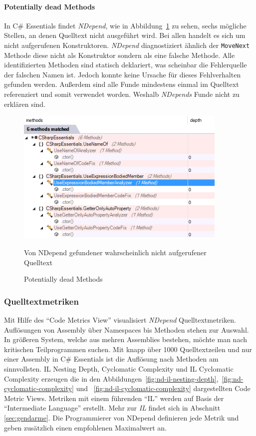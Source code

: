 \paragraph{Potentially dead Methods} In C\# Essentials findet \emph{NDepend}, wie in Abbildung~\ref{fig:dead-methods} zu sehen, sechs mögliche Stellen, an denen Quelltext nicht ausgeführt wird. Bei allen handelt es sich um nicht aufgerufenen Konstruktoren. \emph{NDepend} diagnostiziert ähnlich der \texttt{MoveNext} Methode diese nicht als Konstruktor sondern als eine falsche Methode. Alle identifizierten Methoden sind statisch deklariert, was scheinbar die Fehlerquelle der falschen Namen ist. Jedoch konnte keine Ursache für dieses Fehlverhalten gefunden werden. Außerdem sind alle Funde mindestens einmal im Quelltext referenziert und somit verwendet worden. Weshalb \emph{NDepends} Funde nicht zu erklären sind.

\begin{figure}[!ht]
\centering
\includegraphics[width=0.9\textwidth]{images/dead-methods.png}
\caption{Potentially dead Methods}
\vspace{0.1cm}
Von NDepend gefundener wahrscheinlich nicht aufgerufener Quelltext
\label{fig:dead-methods}
\end{figure}

\subsubsection{Quelltextmetriken}
\label{sec:nd-code-metrics}
Mit Hilfe des \enquote{Code Metrics View} visualisiert \emph{NDepend} Quelltextmetriken. Auflösungen von Assembly über Namespaces bis Methoden stehen zur Auswahl. In größeren System, welche aus mehren Assemblies bestehen, möchte man nach kritischen Teilprogrammen suchen. Mit knapp über 1000 Quelltextzeilen und nur einer Assembly in C\# Essentials ist die Auflösung nach Methoden am sinnvollsten. IL Nesting Depth, Cyclomatic Complexity und IL Cyclomatic Complexity erzeugen die in den Abbildungen~\ref{fig:nd-il-nesting-depth},~\ref{fig:nd-cyclomatic-complexity} und ~\ref{fig:nd-il-cyclomatic-complexity} dargestellten Code Metric Views. Metriken mit einem führenden \enquote{IL} werden auf Basis der \enquote{Intermediate Language} erstellt. Mehr zur \emph{IL} findet sich in Abschnitt \ref{sec:gendarme}. Die Programmierer von NDepend definieren jede Metrik und geben zusätzlich einen empfohlenen Maximalwert an.~\cite{ndepend-metrics}

